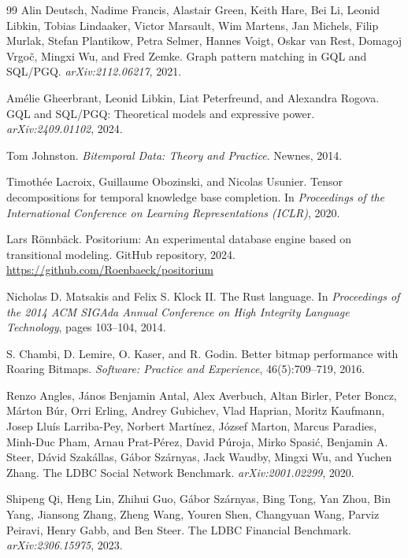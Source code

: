 \documentclass[a4paper,fleqn]{cas-sc}
\theoremstyle{plain}
\theoremstyle{remark}
\begin{document}
\begin{thebibliography}{99}
Alin Deutsch, Nadime Francis, Alastair Green, Keith Hare, Bei Li, Leonid Libkin, Tobias Lindaaker, Victor Marsault, Wim Martens, Jan Michels, Filip Murlak, Stefan Plantikow, Petra Selmer, Hannes Voigt, Oskar van Rest, Domagoj Vrgo\v{c}, Mingxi Wu, and Fred Zemke.
\newblock Graph pattern matching in GQL and SQL/PGQ.
\newblock \emph{arXiv:2112.06217}, 2021.

Am{\'e}lie Gheerbrant, Leonid Libkin, Liat Peterfreund, and Alexandra Rogova.
\newblock GQL and SQL/PGQ: Theoretical models and expressive power.
\newblock \emph{arXiv:2409.01102}, 2024.

Tom Johnston.
\newblock \emph{Bitemporal Data: Theory and Practice}.
\newblock Newnes, 2014.

Timoth{\'e}e Lacroix, Guillaume Obozinski, and Nicolas Usunier.
\newblock Tensor decompositions for temporal knowledge base completion.
\newblock In \emph{Proceedings of the International Conference on Learning Representations (ICLR)}, 2020.

Lars R{\"o}nnb{\"a}ck.
\newblock Positorium: An experimental database engine based on transitional modeling.
\newblock GitHub repository, 2024.
\newblock \url{https://github.com/Roenbaeck/positorium}

Nicholas D. Matsakis and Felix S. Klock II.
\newblock The Rust language.
\newblock In \emph{Proceedings of the 2014 ACM SIGAda Annual Conference on High Integrity Language Technology}, pages 103--104, 2014.

S. Chambi, D. Lemire, O. Kaser, and R. Godin.
\newblock Better bitmap performance with Roaring Bitmaps.
\newblock \emph{Software: Practice and Experience}, 46(5):709--719, 2016.

Renzo Angles, J{\'a}nos Benjamin Antal, Alex Averbuch, Altan Birler, Peter Boncz, M{\'a}rton B{\'u}r, Orri Erling, Andrey Gubichev, Vlad Haprian, Moritz Kaufmann, Josep Llu{\'i}s Larriba-Pey, Norbert Mart{\'i}nez, J{\'o}zsef Marton, Marcus Paradies, Minh-Duc Pham, Arnau Prat-P{\'e}rez, David P{\'u}roja, Mirko Spasi{\'c}, Benjamin A. Steer, D{\'a}vid Szak{\'a}llas, G{\'a}bor Sz{\'a}rnyas, Jack Waudby, Mingxi Wu, and Yuchen Zhang.
\newblock The LDBC Social Network Benchmark.
\newblock \emph{arXiv:2001.02299}, 2020.

Shipeng Qi, Heng Lin, Zhihui Guo, G{\'a}bor Sz{\'a}rnyas, Bing Tong, Yan Zhou, Bin Yang, Jiansong Zhang, Zheng Wang, Youren Shen, Changyuan Wang, Parviz Peiravi, Henry Gabb, and Ben Steer.
\newblock The LDBC Financial Benchmark.
\newblock \emph{arXiv:2306.15975}, 2023.

\end{thebibliography}
\end{document}
